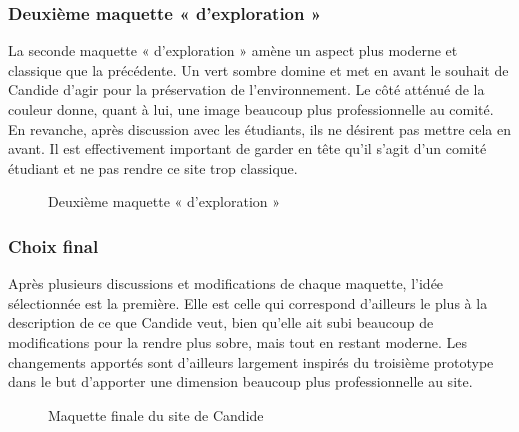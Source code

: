 \documentclass[a4,10pt,french]{sphinxmanual}
\begin{document}
\subsubsection{Deuxième maquette « d’exploration »}
\label{\detokenize{chapitre-06:deuxieme-maquette-dexploration}}
\sphinxAtStartPar
La seconde maquette « d’exploration » amène un aspect plus moderne et classique que la précédente. Un vert sombre domine et met en avant le souhait de Candide d’agir pour la préservation de l’environnement. Le côté atténué de la couleur donne, quant à lui, une image beaucoup plus professionnelle au comité.  En revanche, après discussion avec les étudiants, ils ne désirent pas mettre cela en avant. Il est effectivement important de garder en tête qu’il s’agit d’un comité étudiant et ne pas rendre ce site trop classique.

\begin{figure}[htbp]
\centering
\capstart

\noindent{}
\caption{Deuxième maquette « d’exploration »}\label{\detokenize{chapitre-06:id3}}\end{figure}


\subsubsection{Choix final}
\label{\detokenize{chapitre-06:choix-final}}
\sphinxAtStartPar
Après plusieurs discussions et modifications de chaque maquette, l’idée sélectionnée est la première. Elle est celle qui correspond d’ailleurs le plus à la description de ce que Candide veut, bien qu’elle ait subi beaucoup de modifications pour la rendre plus sobre, mais tout en restant moderne. Les changements apportés sont d’ailleurs largement inspirés du troisième prototype dans le but d’apporter une dimension beaucoup plus professionnelle au site.

\begin{figure}[htbp]
\centering
\capstart

\noindent{}
\caption{Maquette finale du site de Candide}\label{\detokenize{chapitre-06:id4}}\end{figure}



\renewcommand{\indexname}{Index}
\printindex
\end{document}
